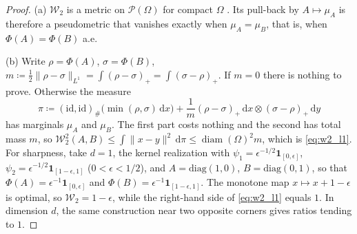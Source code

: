 \documentclass[11pt,a4paper,reqno]{amsart}
\theoremstyle{definition}
\numberwithin{equation}{section}
\newcommand{\dif}{\,\mathrm{d}}
\newcommand{\diam}{\operatorname{diam}}
\begin{document}
\begin{proof}
(a) $\mathcal{W}_2$ is a metric on $\mathcal{P}(\Omega)$ for compact $\Omega$ \cite[Ch.~6]{villani2009optimal}. Its pull-back by $A \mapsto \mu_A$ is therefore a pseudometric that vanishes exactly when $\mu_A = \mu_B$, that is, when $\Phi(A) = \Phi(B)$ a.e.

(b) Write $\rho = \Phi(A)$, $\sigma = \Phi(B)$, $m \coloneqq \frac{1}{2}\|\rho - \sigma\|_{L^1} = \int (\rho - \sigma)_+ = \int (\sigma - \rho)_+$. If $m = 0$ there is nothing to prove. Otherwise the measure
\begin{equation}
    \pi \coloneqq (\mathrm{id}, \mathrm{id})_\# \big(\min(\rho, \sigma) \dif x\big) + \frac{1}{m} (\rho - \sigma)_+ \dif x \otimes (\sigma - \rho)_+ \dif y
\end{equation}
has marginals $\mu_A$ and $\mu_B$. The first part costs nothing and the second has total mass $m$, so $\mathcal{W}_2^2(A,B) \le \int \|x-y\|^2 \dif \pi \le \diam(\Omega)^2 m$, which is \eqref{eq:w2_l1}. For sharpness, take $d = 1$, the kernel realization with $\psi_1 = \epsilon^{-1/2}\mathbf{1}_{[0,\epsilon]}$, $\psi_2 = \epsilon^{-1/2}\mathbf{1}_{[1-\epsilon,1]}$ ($0 < \epsilon < 1/2$), and $A = \mathrm{diag}(1,0)$, $B = \mathrm{diag}(0,1)$, so that $\Phi(A) = \epsilon^{-1}\mathbf{1}_{[0,\epsilon]}$ and $\Phi(B) = \epsilon^{-1}\mathbf{1}_{[1-\epsilon,1]}$. The monotone map $x \mapsto x + 1 - \epsilon$ is optimal, so $\mathcal{W}_2 = 1 - \epsilon$, while the right-hand side of \eqref{eq:w2_l1} equals $1$. In dimension $d$, the same construction near two opposite corners gives ratios tending to $1$.


\end{proof}
\end{document}
